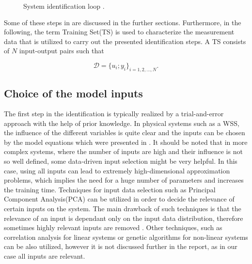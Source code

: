 \begin{figure}[H]
\centering
 
\caption{System identification loop \cite{nelles2013nonlinear}.}
\label{fig:identification_loop}
\end{figure}

\vspace{-3mm}

Some of these steps in  are discussed in the further sections. Furthermore, in the following, the term Training Set(TS) is used to characterize the measurement data that is utilized to carry out the presented identification steps. A TS consists of $N$ input-output pairs such that

\begin{equation}
  \label{training set}
  \mathcal{D} = \{u_i ; y_i\}_{i = 1,2, ..., N}.
\end{equation}

\subsection{Choice of the model inputs}
\label{choice_of_the_model_inputs}

The first step in the identification is typically realized by a trial-and-error approach with the help of prior knowledge. In physical systems such as a WSS, the influence of the different variables is quite clear and the inputs can be chosen by the model equations which were presented in . It should be noted that in more complex systems, where the number of inputs are high and their influence is not so well defined, some data-driven input selection might be very helpful. In this case, using all inputs can lead to extremely high-dimensional approximation problems, which implies the need for a huge number of parameters and increases the training time. Techniques for input data selection such as Principal Component Analysis(PCA) can be utilized in order to decide the relevance of certain inputs on the system. The main drawback of such techniques is that the relevance of an input is dependant only on the input data distribution, therefore sometimes highly relevant inputs are removed \cite{nelles2013nonlinear}.  Other techniques, such as correlation analysis for linear systems or genetic algorithms for non-linear systems can be also utilized, however it is not discussed further in the report, as in our case all inputs are relevant. 

